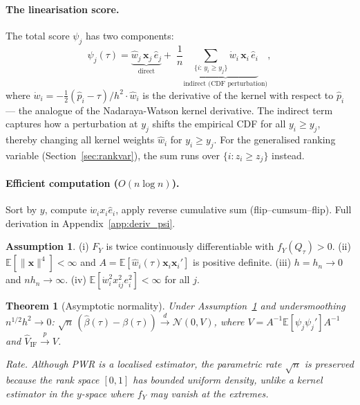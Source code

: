 \documentclass[12pt,a4paper]{article}
\newtheorem{theorem}{Theorem}
\theoremstyle{definition}
\newtheorem{assumption}{Assumption}
\newcommand{\E}{\mathbb{E}}
\newcommand{\bx}{\mathbf{x}}
\newcommand{\hbeta}{\hat{\beta}}
\newcommand{\hp}{\hat{p}}
\newcommand{\hw}{\hat{w}}
\begin{document}
\paragraph{The linearisation score.}
The total score $\psi_j$ has two components:
\begin{equation}
  \psi_j(\tau) =
  \underbrace{\hw_j\,\bx_j\,\hat{e}_j}_{\text{direct}}
  +\;\frac{1}{n}
  \underbrace{\sum_{\{i:\,y_i \geq y_j\}}
    \dot{w}_i\,\bx_i\,\hat{e}_i}_{\text{indirect (CDF perturbation)}},
  \label{eq:score}
\end{equation}
where $\dot{w}_i = -\tfrac{1}{2}(\hp_i-\tau)/h^2 \cdot \hw_i$ is the
derivative of the kernel with respect to $\hat{p}_i$ --- the analogue
of the Nadaraya-Watson kernel derivative. The indirect term captures how
a perturbation at $y_j$ shifts the empirical CDF for all $y_i \geq y_j$,
thereby changing all kernel weights $\hw_i$ for $y_i\geq y_j$.
For the generalised ranking variable (Section~\ref{sec:rankvar}), the
sum runs over $\{i: z_i \geq z_j\}$ instead.

\paragraph{Efficient computation ($O(n\log n)$).}
Sort by $y$, compute $\dot{w}_i x_i\hat{e}_i$, apply reverse cumulative
sum (flip--cumsum--flip). Full derivation in
Appendix~\ref{app:deriv_psi}.

\begin{assumption}
\label{asm:regularity}
(i) $F_Y$ is twice continuously differentiable with $f_Y(Q_\tau)>0$.
(ii) $\E[\|\bx\|^4]<\infty$ and $A=\E[\hw_i(\tau)\bx_i\bx_i']$ is
positive definite.
(iii) $h=h_n\to 0$ and $nh_n\to\infty$.
(iv) $\E[\dot{w}_i^2 x_{ij}^2 e_i^2]<\infty$ for all $j$.
\end{assumption}

\begin{theorem}[Asymptotic normality]
\label{thm:asym}
Under Assumption~\ref{asm:regularity} and undersmoothing
$n^{1/2}h^2\to 0$:
$\sqrt{n}\,(\hbeta(\tau)-\beta(\tau)) \xrightarrow{d}
\mathcal{N}(0,V)$,
where $V = A^{-1}\E[\psi_j\psi_j']A^{-1}$ and
$\hat{V}_{\mathrm{IF}} \xrightarrow{p} V$.

\noindent\textit{Rate.} Although PWR is a localised estimator, the
parametric rate $\sqrt{n}$ is preserved because the rank space
$[0,1]$ has bounded uniform density, unlike a kernel estimator in
the $y$-space where $f_Y$ may vanish at the extremes.
\end{theorem}
\end{document}
